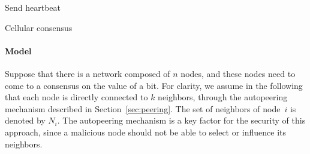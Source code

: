\documentclass[../main.tex]{subfiles}
\begin{document}

\begin{algorithm}[h]
	\DontPrintSemicolon
			
	\caption{Send heartbeat}
	\label{alg:heartbeat}
\end{algorithm}

\begin{algorithm}[h]
	\DontPrintSemicolon
			
	\BlankLine
			
	\caption{Cellular consensus}
	\label{alg:cell}
\end{algorithm}

\paragraph{Model}

Suppose that there is a network composed of $n$ nodes, and these nodes need to come to a consensus on the value of a bit.
For clarity, we assume in the following that each node is directly connected to $k$ neighbors, through the autopeering mechanism described in Section~\ref{sec:peering}.
The set of neighbors of node~$i$ is denoted by $N_i$.
The autopeering mechanism is a key factor for the security of this approach, since a malicious node should not be able to select or influence its neighbors.
\end{document}
